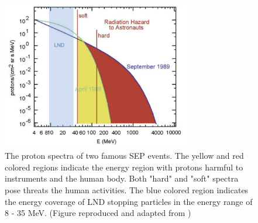 \begin{figure}[!htb]
	\centering
	\includegraphics[width = 0.75\textwidth, height = 0.3\textheight]{images/SEP-radiation_hazard.png}
	\caption[The proton spectra in two \ac{SEP} events indicating the possible radiation energy]{The proton spectra of two famous \ac{SEP} events. The yellow and red colored regions indicate the energy region with protons harmful to instruments and the human body. Both "hard" and "soft" spectra pose threats the human activities. The blue colored region indicates the energy coverage of \acs{LND} stopping particles in the energy range of 8 - 35 MeV. (Figure reproduced and adapted from \citet{Reames2021LNP})}
	\label{Fig:SEP-radiation_hazard}
\end{figure}






